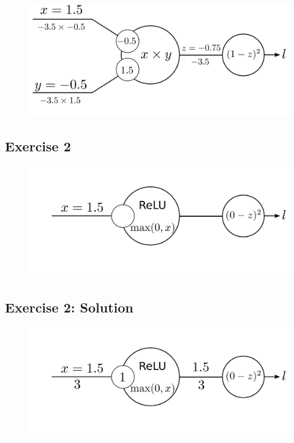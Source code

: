 \documentclass{book}
\begin{document}
\begin{figure}[h]
    \centering
    \includegraphics[width=\textwidth]{bp_2_1_neuron_exo_sol.png}
\end{figure}

\subsection{Exercise 2}

\begin{figure}[h]
    \centering
    \includegraphics[width=\textwidth]{bp_relu_exo.png}
\end{figure}

\subsection{Exercise 2: Solution}

\begin{figure}[h]
    \centering
    \includegraphics[width=\textwidth]{bp_relu_exo_sol.png}
\end{figure}
\end{document}
